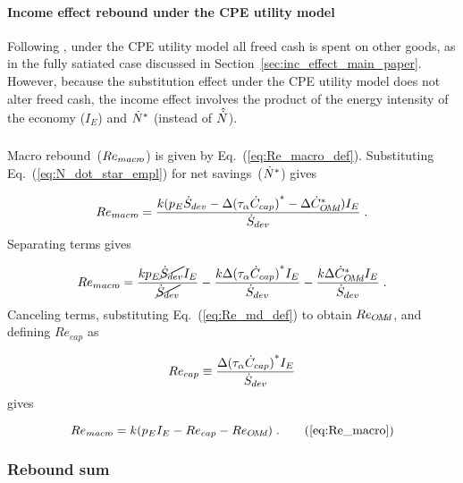 \paragraph{Income effect rebound under the CPE utility model}
\label{sec:income_effect_CPE}

Following \citet{Borenstein:2015aa},
under the CPE utility model
all freed cash is spent on other goods,
as in the fully satiated case discussed
in Section~\ref{sec:inc_effect_main_paper}.
However, because the substitution effect
under the CPE utility model
does not alter freed cash,
the income effect
involves the product of
the energy intensity of the economy ($I_E$)
and ${\dot{N}}^*$
(instead of $\hat{\dot{N}}$).


\subsubsection{\Macroeffect{}}
\label{sec:Re_macro}

Macro rebound~($Re_{macr\!o}$) is given by Eq.~(\ref{eq:Re_macro_def}).
Substituting Eq.~(\ref{eq:N_dot_star_empl}) for net savings~(${\dot{N}}^*$) gives

\begin{equation}
  Re_{macr\!o} = \frac{k (p_E \dot{S}_{dev} - \Delta {(\tau_\alpha \dot{C}_{cap})}^* - \Delta {\dot{C}}^*_{O\!M\!d}) I_E}{\dot{S}_{dev}} \; .
\end{equation}
%
Separating terms gives

\begin{equation}
  Re_{macr\!o} = \frac{k p_E \cancel{\dot{S}_{dev}} I_E}{\cancel{\dot{S}_{dev}}}
                                - \frac{k \Delta {(\tau_\alpha  \dot{C}_{cap})}^* I_E}{\dot{S}_{dev}}
                                - \frac{k \Delta {\dot{C}}^*_{O\!M\!d} I_E}{\dot{S}_{dev}} \; .
\end{equation}
%
Canceling terms, substituting Eq.~(\ref{eq:Re_md_def}) to obtain $Re_{O\!M\!d}$, and
defining $Re_{cap}$ as

\begin{equation} \label{eq:Re_cap}
  Re_{cap} \equiv \frac{\Delta {(\tau_\alpha \dot{C}_{cap})}^* I_E}{\dot{S}_{dev}}{}
\end{equation}
%
gives

\begin{equation}
  Re_{\macro} = \Remacroeqn{} \; . \tag{\ref{eq:Re_macro}}
\end{equation}


\subsubsection{Rebound sum}
\label{sec:total_rebound}

